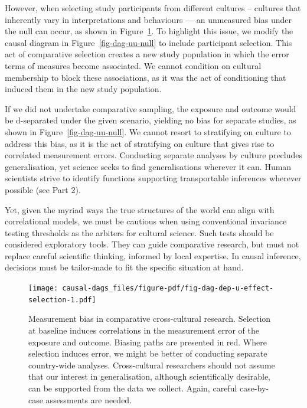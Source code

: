 \documentclass[
  singlecolumn]{article}
\begin{document}
However, when selecting study participants from different cultures --
cultures that inherently vary in interpretations and behaviours --- an
unmeasured bias under the null can occur, as shown in
Figure~\ref{fig-dag-dep-u-effect-selection}. To highlight this issue, we
modify the causal diagram in Figure~\ref{fig-dag-uu-null} to include
participant selection. This act of comparative selection creates a new
study population in which the error terms of measures become associated.
We cannot condition on cultural membership to block these associations,
as it was the act of conditioning that induced them in the new study
population.

If we did not undertake comparative sampling, the exposure and outcome
would be d-separated under the given scenario, yielding no bias for
separate studies, as shown in Figure~\ref{fig-dag-uu-null}. We cannot
resort to stratifying on culture to address this bias, as it is the act
of stratifying on culture that gives rise to correlated measurement
errors. Conducting separate analyses by culture precludes
generalisation, yet science seeks to find generalisations wherever it
can. Human scientists strive to identify functions supporting
transportable inferences wherever possible (see Part 2).

Yet, given the myriad ways the true structures of the world can align
with correlational models, we must be cautious when using conventional
invariance testing thresholds as the arbiters for cultural science. Such
tests should be considered exploratory tools. They can guide comparative
research, but must not replace careful scientific thinking, informed by
local expertise. In causal inference, decisions must be tailor-made to
fit the specific situation at hand.

\begin{figure}

{\centering \texttt{[image: causal-dags\_files/figure-pdf/fig-dag-dep-u-effect-selection-1.pdf]}

}

\caption{\label{fig-dag-dep-u-effect-selection}Measurement bias in
comparative cross-cultural research. Selection at baseline induces
correlations in the measurement error of the exposure and outcome.
Biasing paths are presented in red. Where selection induces error, we
might be better of conducting separate country-wide analyses.
Cross-cultural researchers should not assume that our interest in
generalisation, although scientifically desirable, can be supported from
the data we collect. Again, careful case-by-case assessments are
needed.}

\end{figure}
\end{document}
